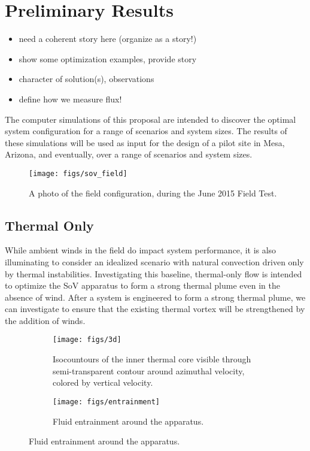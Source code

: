  
\section{Preliminary Results}
\label{sec:results}

\begin{itemize}
\item need a coherent story here (organize as a story!)
\item show some optimization examples, provide story
\item character of solution(s), observations
\item define how we measure flux!
\end{itemize}



The computer simulations of this proposal are intended to discover the
optimal system configuration for a range of scenarios and system
sizes. The results of these simulations will be used as input for the
design of a pilot site in Mesa, Arizona, and eventually, over a range of
scenarios and system sizes. 

  \begin{figure}[!htb]
   \begin{center}
    \texttt{[image: figs/sov\_field]}
    \caption{A photo of the field configuration, during the June 2015
    Field Test.}
    \label{fig:field_real}
   \end{center}
  \end{figure}


\subsection{Thermal Only}

While ambient winds in the field do impact system performance, it is
also illuminating to consider an idealized scenario with natural convection
driven only by thermal instabilities. Investigating this baseline,
thermal-only flow is intended to optimize the SoV apparatus to form a
strong thermal plume even in the absence of wind. After a system is
engineered to form a strong thermal plume, we can investigate to ensure
that the existing thermal vortex will be strengthened by the addition of
winds. 

\begin{figure}[htb]

 \begin{subfigure}{.55\textwidth}
  \centering
  \texttt{[image: figs/3d]}
  \caption{Isocountours of the inner thermal core
  visible through semi-transparent contour around azimuthal velocity,
  colored by vertical velocity. }
  \label{fig:thermal}  
 \end{subfigure}%
 \begin{subfigure}{.4\textwidth}
  \centering
  \texttt{[image: figs/entrainment]}%
  \caption{Fluid entrainment around the apparatus.} 
  \label{fig:entrain}  
 \end{subfigure}%
\end{figure}

